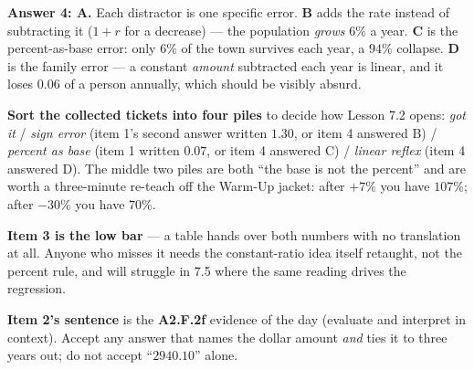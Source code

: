 \documentclass[10pt]{article}
\begin{document}
\begin{teachernote}
\textbf{Answer 4: A.} Each distractor is one specific error. \textbf{B} adds the rate instead of
subtracting it ($1+r$ for a decrease) --- the population \emph{grows} $6\%$ a year. \textbf{C} is the
percent-as-base error: only $6\%$ of the town survives each year, a $94\%$ collapse. \textbf{D} is
the family error --- a constant \emph{amount} subtracted each year is linear, and it loses
$0.06$ of a person annually, which should be visibly absurd.

\textbf{Sort the collected tickets into four piles} to decide how Lesson 7.2 opens:
\emph{got it} / \emph{sign error} (item 1's second answer written $1.30$, or item 4 answered B) /
\emph{percent as base} (item 1 written $0.07$, or item 4 answered C) / \emph{linear reflex}
(item 4 answered D). The middle two piles are both ``the base is not the percent'' and are worth a
three-minute re-teach off the Warm-Up jacket: after $+7\%$ you have $107\%$; after $-30\%$ you have
$70\%$.

\textbf{Item 3 is the low bar} --- a table hands over both numbers with no translation at all.
Anyone who misses it needs the constant-ratio idea itself retaught, not the percent rule, and will
struggle in 7.5 where the same reading drives the regression.

\textbf{Item 2's sentence} is the \textbf{A2.F.2f} evidence of the day (evaluate and interpret in
context). Accept any answer that names the dollar amount \emph{and} ties it to three years out; do
not accept ``$2940.10$'' alone.
\end{teachernote}
\end{document}
